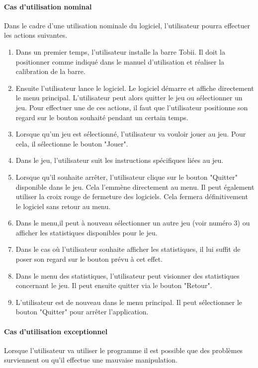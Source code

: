 \documentclass{polytech/polytech}
\begin{document}
\paragraph{Cas d'utilisation nominal}
Dans le cadre d'une utilisation nominale du logiciel, l'utilisateur pourra effectuer les actions suivantes.

\begin{enumerate}
\item Dans un premier temps, l'utilisateur installe la barre Tobii. Il doit la positionner comme indiqué dans le manuel d'utilisation et réaliser la calibration de la barre.
\item Ensuite l'utilisateur lance le logiciel. Le logiciel démarre et affiche directement le menu principal. L'utilisateur peut alors quitter le jeu ou sélectionner un jeu. Pour effectuer une de ces actions, il faut que l'utilisateur positionne son regard sur le bouton souhaité pendant un certain temps.
\item Lorsque qu'un jeu est sélectionné, l'utilisateur va vouloir  jouer au jeu. Pour cela, il sélectionne le bouton "Jouer".
\item Dans le jeu, l'utilisateur suit les instructions spécifiques liées au jeu.
\item Lorsque qu'il souhaite arrêter, l'utilisateur clique sur le bouton "Quitter" disponible dans le jeu. Cela l'emmène directement au menu. Il peut également utiliser la croix rouge de fermeture des logiciels. Cela fermera définitivement le logiciel sans retour au menu.
\item Dans le menu,il peut à nouveau sélectionner un autre jeu (voir numéro 3) ou afficher les statistiques disponibles pour le jeu.
\item Dans le cas où l'utilisateur souhaite afficher les statistiques, il lui suffit de poser son regard sur le bouton prévu à cet effet.
\item Dans le menu des statistiques, l'utilisateur peut visionner des statistiques concernant le jeu. Il peut ensuite quitter via le bouton "Retour".
\item L'utilisateur est de nouveau dans le menu principal. Il peut sélectionner le bouton "Quitter" pour arrêter l'application.
\end{enumerate}

\paragraph{Cas d'utilisation exceptionnel}
Lorsque l'utilisateur va utiliser le programme il est possible que des problèmes surviennent ou qu'il effectue une mauvaise manipulation.
\end{document}

